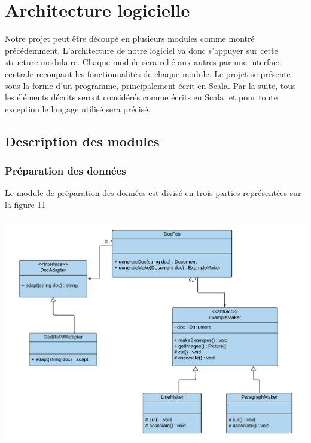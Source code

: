 \chapter{Architecture logicielle}

Notre projet peut être découpé en plusieurs modules comme montré précédemment.
L’architecture de notre logiciel va donc s’appuyer sur cette structure
modulaire. Chaque module sera relié aux autres par une interface centrale
recoupant les fonctionnalités de chaque module.
Le projet se présente sous la forme d’un programme, principalement écrit en Scala.
Par la suite, tous les éléments décrits seront considérés comme écrits en Scala,
et pour toute exception le langage utilisé sera précisé.

\section{Description des modules}

\subsection{Préparation des données}

Le module de préparation des données est divisé en trois parties représentées
sur la figure 11.

\paragraph{}

\begin{mdframed}[frametitle={Figure 11 : Diagramme de classes de la partie préparation des données}, innerbottommargin=10]
\begin{center}
\includegraphics[scale=0.5]{prepa-data.pdf}
\end{center}
\end{mdframed}

